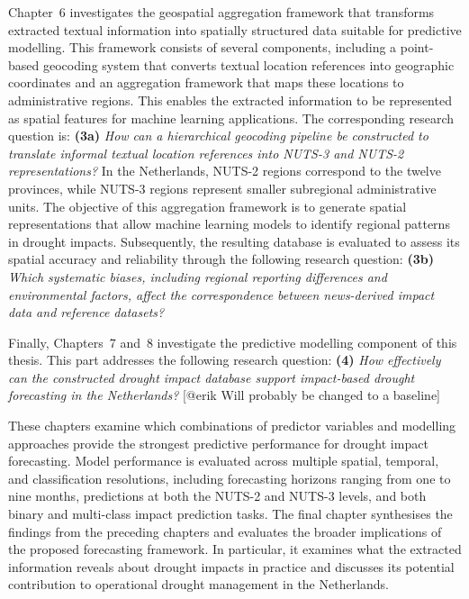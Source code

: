 Chapter~6 investigates the geospatial aggregation framework that transforms extracted textual information into spatially structured data suitable for predictive modelling. This framework consists of several components, including a point-based geocoding system that converts textual location references into geographic coordinates and an aggregation framework that maps these locations to administrative regions. This enables the extracted information to be represented as spatial features for machine learning applications. The corresponding research question is: \textbf{(3a)} \textit{How can a hierarchical geocoding pipeline be constructed to translate informal textual location references into NUTS-3 and NUTS-2 representations?} In the Netherlands, NUTS-2 regions correspond to the twelve provinces, while NUTS-3 regions represent smaller subregional administrative units. The objective of this aggregation framework is to generate spatial representations that allow machine learning models to identify regional patterns in drought impacts. Subsequently, the resulting database is evaluated to assess its spatial accuracy and reliability through the following research question: \textbf{(3b)} \textit{Which systematic biases, including regional reporting differences and environmental factors, affect the correspondence between news-derived impact data and reference datasets?}


Finally, Chapters~7 and~8 investigate the predictive modelling component of this thesis. This part addresses the following research question: \textbf{(4)} \textit{How effectively can the constructed drought impact database support impact-based drought forecasting in the Netherlands?} [@erik Will probably be changed to a baseline]

These chapters examine which combinations of predictor variables and modelling approaches provide the strongest predictive performance for drought impact forecasting. Model performance is evaluated across multiple spatial, temporal, and classification resolutions, including forecasting horizons ranging from one to nine months, predictions at both the NUTS-2 and NUTS-3 levels, and both binary and multi-class impact prediction tasks. The final chapter synthesises the findings from the preceding chapters and evaluates the broader implications of the proposed forecasting framework. In particular, it examines what the extracted information reveals about drought impacts in practice and discusses its potential contribution to operational drought management in the Netherlands.
